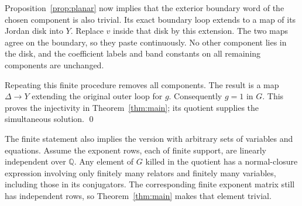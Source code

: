 Proposition~\ref{prop:planar} now implies that the exterior boundary
word of the chosen component is also trivial. Its exact boundary loop
extends to a map of its Jordan disk into $Y$. Replace $v$ inside that
disk by this extension. The two maps agree on the boundary, so they
paste continuously. No other component lies in the disk, and the
coefficient labels and band constants on all remaining components are
unchanged.

Repeating this finite procedure removes all components. The result is
a map $\Delta\to Y$ extending the original outer loop for $g$.
Consequently $g=1$ in $G$. This proves the injectivity in
Theorem~\ref{thm:main}; its quotient supplies the simultaneous solution.
\qed

\begin{remark}\label{rem:infinite-systems}
The finite statement also implies the version with arbitrary sets of
variables and equations. Assume the exponent rows, each of finite
support, are linearly independent over $\mathbb Q$. Any element of
$G$ killed in the quotient has a normal-closure expression involving
only finitely many relators and finitely many variables, including those
in its conjugators. The corresponding finite exponent matrix still has
independent rows, so Theorem~\ref{thm:main} makes that element trivial.
\end{remark}
